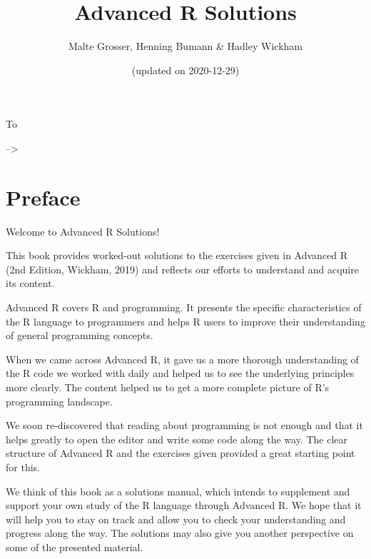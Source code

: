 \documentclass[
]{krantz}
\title{Advanced R Solutions}
\author{Malte Grosser, Henning Bumann \& Hadley Wickham}
\date{(updated on 2020-12-29)}
\begin{document}
\maketitle


\thispagestyle{empty}

\begin{center}
To %


\end{center}

\setlength{\abovedisplayskip}{-5pt}
\setlength{\abovedisplayshortskip}{-5pt}

{
\setcounter{tocdepth}{1}
\tableofcontents
}
--\textgreater{}

\mainmatter

\hypertarget{preface}{%
\chapter{Preface}\label{preface}}

Welcome to Advanced R Solutions!

This book provides worked-out solutions to the exercises given in Advanced R (2nd Edition, Wickham, 2019) and reflects our efforts to understand and acquire its content.

Advanced R covers R and programming. It presents the specific characteristics of the R language to programmers and helps R users to improve their understanding of general programming concepts.

When we came across Advanced R, it gave us a more thorough understanding of the R code we worked with daily and helped us to see the underlying principles more clearly. The content helped us to get a more complete picture of R's programming landscape.

We soon re-discovered that reading about programming is not enough and that it helps greatly to open the editor and write some code along the way. The clear structure of Advanced R and the exercises given provided a great starting point for this.

We think of this book as a solutions manual, which intends to supplement and support your own study of the R language through Advanced R. We hope that it will help you to stay on track and allow you to check your understanding and progress along the way. The solutions may also give you another perspective on some of the presented material.
\end{document}
